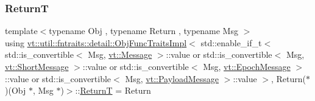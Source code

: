 \subsubsection{\texorpdfstring{ReturnT}{ReturnT}}
{\footnotesize\ttfamily template$<$typename Obj , typename Return , typename Msg $>$ \\
using \hyperlink{structvt_1_1util_1_1fntraits_1_1detail_1_1_obj_func_traits_impl}{vt\+::util\+::fntraits\+::detail\+::\+Obj\+Func\+Traits\+Impl}$<$ std\+::enable\+\_\+if\+\_\+t$<$ std\+::is\+\_\+convertible$<$ Msg, \hyperlink{namespacevt_a3a3ddfef40b4c90915fa43cdd5f129ea}{vt\+::\+Message} $>$\+::value or std\+::is\+\_\+convertible$<$ Msg, \hyperlink{namespacevt_a1125ac1da6c0bbf141e0ea0739d7602d}{vt\+::\+Short\+Message} $>$\+::value or std\+::is\+\_\+convertible$<$ Msg, \hyperlink{namespacevt_ad67368ffae52d7325002586b41bb150e}{vt\+::\+Epoch\+Message} $>$\+::value or std\+::is\+\_\+convertible$<$ Msg, \hyperlink{namespacevt_a89a92229c5622b855c02c549f83a1a68}{vt\+::\+Payload\+Message} $>$\+::value $>$, Return($\ast$)(Obj $\ast$, Msg $\ast$)$>$\+::\hyperlink{structvt_1_1util_1_1fntraits_1_1detail_1_1_obj_func_traits_impl_3_01std_1_1enable__if__t_3_01std573a703ad4f1a8441021e31e0f1928d5_a45ecfa42e04b5fb93a9702866a82ba07}{ReturnT} =  Return}



